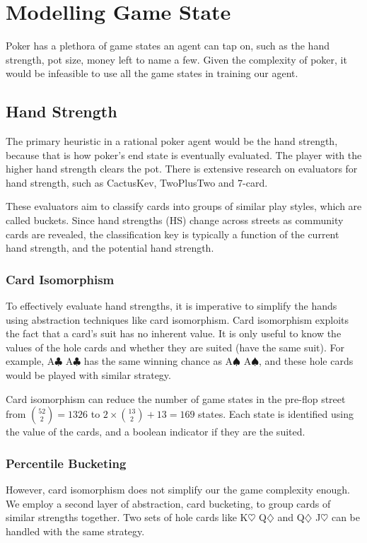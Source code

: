\documentclass{article}
\begin{document}
\section{Modelling Game State}
Poker has a plethora of game states an agent can tap on, such as the hand strength, pot size, money left to name a few. Given the complexity of poker, it would be infeasible to use all the game states in training our agent.

\subsection{Hand Strength}
The primary heuristic in a rational poker agent would be the hand strength, because that is how poker's end state is eventually evaluated. The player with the higher hand strength clears the pot. There is extensive research on evaluators for hand strength, such as CactusKev, TwoPlusTwo and 7-card.

These evaluators aim to classify cards into groups of similar play styles, which are called buckets. Since hand strengths (HS) change across streets as community cards are revealed, the classification key is typically a function of the current hand strength, and the potential hand strength.

\subsubsection{Card Isomorphism}
To effectively evaluate hand strengths, it is imperative to simplify the hands using abstraction techniques like card isomorphism. Card isomorphism exploits the fact that a card's suit has no inherent value. It is only useful to know the values of the hole cards and whether they are suited (have the same suit). For example, A$\clubsuit$ A$\clubsuit$ has the same winning chance as A$\spadesuit$ A$\spadesuit$, and these hole cards would be played with similar strategy.

Card isomorphism can reduce the number of game states in the pre-flop street from ${52 \choose 2} = 1326$ to $2 \times {13 \choose 2} + 13 = 169$ states. Each state is identified using the value of the cards, and a boolean indicator if they are the suited.

\subsubsection{Percentile Bucketing}
However, card isomorphism does not simplify our the game complexity enough. We employ a second layer of abstraction, card bucketing, to group cards of similar strengths together. Two sets of hole cards like K$\heartsuit$ Q$\diamondsuit$ and Q$\diamondsuit$ J$\heartsuit$ can be handled with the same strategy.
\end{document}
